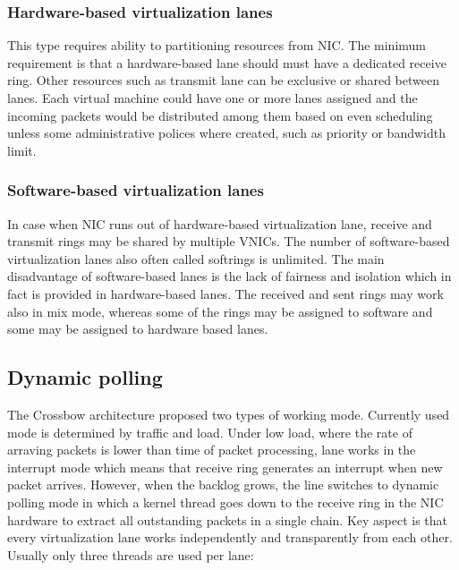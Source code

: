 \documentclass[11pt]{book}
\begin{document}
			\subsubsection{Hardware-based virtualization lanes}
			
			This type requires ability to partitioning resources from NIC. The minimum requirement is that a hardware-based lane should must have a dedicated receive ring.
			Other resources such as transmit lane can be exclusive or shared between lanes. Each virtual machine could have one or more lanes assigned and the incoming packets
			would be distributed among them based on even scheduling unless some administrative polices where created, such as priority or bandwidth limit.		
			
			\subsubsection{Software-based virtualization lanes}
			
			In case when NIC runs out of hardware-based virtualization lane, receive and transmit rings may be shared by multiple VNICs. The number of software-based virtualization 
			lanes also often called softrings is unlimited. The main disadvantage of software-based lanes is the lack of fairness and isolation which in fact is provided in hardware-based
			lanes. The received and sent rings may work also in mix mode, whereas some of the rings may be assigned to software and some may be assigned to hardware based lanes.	
			
		\subsection{Dynamic polling}	
			
			The Crossbow architecture proposed two types of working mode. Currently used mode is determined by traffic and load. Under low load, where the rate of arraving packets is lower than
			time of packet processing, lane works in the interrupt mode which means that receive ring generates an interrupt when new packet arrives. However, when the backlog grows, the line 
			switches to dynamic polling mode in which a kernel thread goes down to the receive ring in the NIC hardware to extract all outstanding packets in a single chain. Key aspect is that 
			every virtualization lane works independently and transparently from each other. Usually only three threads are used per lane:
			
\end{document}
